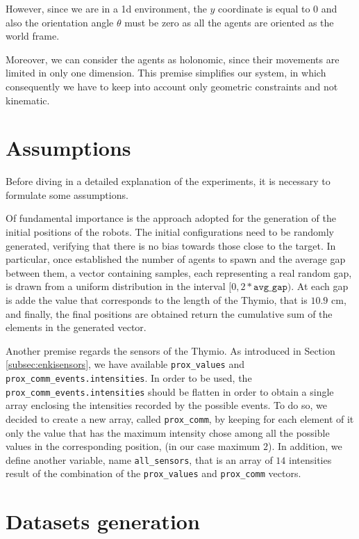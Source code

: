 However, since we are in a \gls{1d} environment, the $y$ coordinate is equal 
to $0$ and also the orientation angle $\theta$ must be zero as all the agents are 
oriented as the world frame. 

Moreover, we can consider the agents as holonomic, since their movements are 
limited in only one dimension. This premise simplifies our system, in which 
consequently we have to keep into account only geometric constraints and not
kinematic.

\section{Assumptions}
\label{sec:assum}
Before diving in a detailed explanation of the experiments, it is necessary to 
formulate some assumptions.

Of fundamental importance is the approach adopted for the generation of the 
initial positions of the robots.
The initial configurations need to be randomly generated, verifying that there is 
no bias towards those close to the target.
In particular, once established the number of agents to spawn and the average 
gap between them, a vector containing samples, each representing a real random 
gap, is drawn from a uniform distribution in the interval $[0, 
2*\mathtt{avg\_gap})$. 
At each gap is adde the value that corresponds to the length of the Thymio, that is 
$10.9$ \gls{cm}, and finally, the final positions are obtained return the cumulative 
sum of the elements in the generated vector. 

Another premise regards the sensors of the Thymio. 
As introduced in Section \ref{subsec:enkisensors}, we have available 
\texttt{prox\_values} and \texttt{prox\_comm\_events.intensities}. In order to be 
used, the \texttt{prox\_comm\_events.intensities} should be flatten in order to 
obtain a single array enclosing the intensities recorded by the possible events. 
To do so, we decided to create a new array, called \texttt{prox\_comm}, by 
keeping for each element of it only the value that has the maximum intensity 
chose among all the possible values in the corresponding position, (in our case 
maximum $2$).
In addition, we define another variable, name \texttt{all\_sensors}, that is an array 
of $14$ intensities result of the combination of the \texttt{prox\_values} and 
\texttt{prox\_comm} vectors.

\section{Datasets generation}
\label{sec:dataset}

